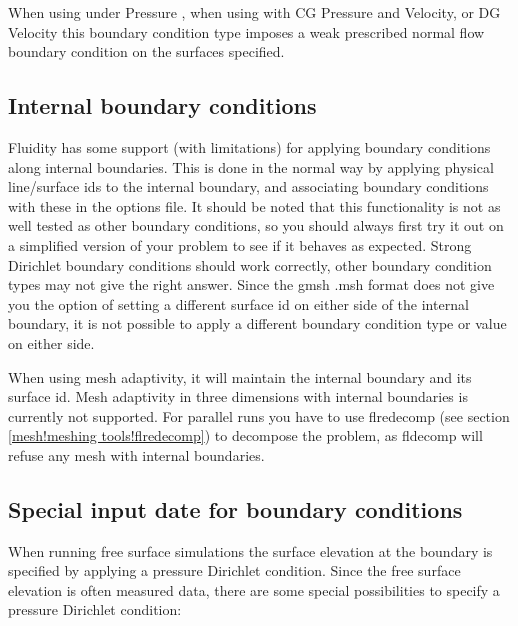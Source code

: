 When using  under Pressure , when using 
 with CG Pressure and Velocity, or DG Velocity this boundary condition type 
imposes a weak prescribed normal flow boundary condition on the surfaces specified.


\subsection{Internal boundary conditions}\label{sec:internal_bcs}
Fluidity has some support (with limitations) for applying boundary conditions
along internal boundaries. This is done in the normal way 
by applying physical line/surface ids to the internal boundary, and associating
boundary conditions with these in the options file. It should be
noted that this functionality is not as well tested as other boundary
conditions, so you should always first try it out on a simplified version of
your problem to see if it behaves as expected. Strong Dirichlet boundary
conditions should work correctly, other boundary condition types may not give
the right answer. Since the gmsh .msh format does not give you the
option of setting a different surface id on either side of the internal
boundary, it is not possible to apply a different boundary condition type or
value on either side.

When using mesh adaptivity, it will maintain the internal boundary and its
surface id. Mesh adaptivity in three dimensions with internal boundaries 
is currently not supported. For parallel runs you have to use flredecomp (see
section \ref{mesh!meshing tools!flredecomp}) to
decompose the problem, as fldecomp will refuse any mesh with internal boundaries.

\subsection{Special input date for boundary conditions}\label{sec:BCs:specialised}

When running free surface simulations the surface elevation at the boundary is specified by applying a pressure Dirichlet condition. Since the free surface elevation is often measured data, there are some special possibilities to specify a pressure Dirichlet condition: 

